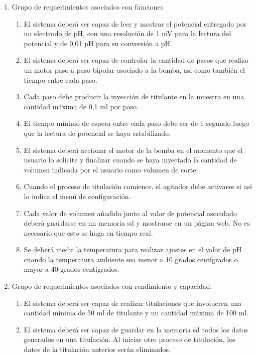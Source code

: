 \documentclass[11pt]{charter}
\begin{document}
\begin{enumerate}
\item Grupo de requerimientos asociados con funciones
	\begin{enumerate}
	\item El sistema deberá ser capaz de leer y mostrar el potencial entregado por un electrodo de pH, con una resolución de 1 mV para la lectura del potencial y de 0,01 pH para su conversión a pH.
	\item El sistema deberá ser capaz de controlar la cantidad de pasos que realiza un motor paso a paso bipolar asociado a la bomba, asi como también el tiempo entre cada paso.
	\item Cada paso debe producir la inyección de titulante en la muestra en una cantidad máxima de 0,1 ml por paso.
	\item El tiempo mínimo de espera entre cada paso debe ser de 1 segundo luego que la lectura de potencial se haya estabilizado.
	\item El sistema deberá accionar el motor de la bomba en el momento que el usuario lo solicite y finalizar cuando se haya inyectado la cantidad de volumen indicada por el usuario como volumen de corte.
	\item Cuando el proceso de titulación comience, el agitador debe activarse si así lo indica el menú de configuración.
	\item Cada valor de volumen añadido junto al valor de potencial asocidado deberá guardarse en un memoria sd y mostrarse en un página web. No es necesario que esto se haga en tiempo real.
	\item Se deberá medir la temperatura para realizar ajustes en el valor de pH cuando la temperatura ambiente sea menor a 10 grados centígrados o mayor a 40 grados centígrados.
	\end{enumerate}
	
\item Grupo de requerimientos asociados con rendimiento y capacidad:
	\begin{enumerate}
	\item El sistema deberá ser capaz de realizar titulaciones que involucren una cantidad mínima de 50 ml de titulante y un cantidad máxima de 100 ml.
	\item El sistema deberá ser capaz de guardar en la memoria sd todos los datos generados en una titulación. Al iniciar otro proceso de titulación, los datos de la titulación anterior serán eliminados.
	\end{enumerate}
\end{enumerate}
\end{document}
